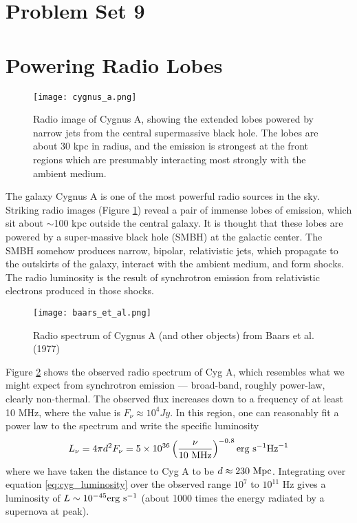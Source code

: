 \documentclass[11pt]{article}
\begin{document}
\pagestyle{empty}

\section*{\centering Problem Set 9}

\section{Powering Radio Lobes}

\begin{figure}[!ht]\centering
\texttt{[image: cygnus\_a.png]}
\caption{
Radio image of Cygnus A, showing the extended lobes powered by narrow jets from
the central supermassive black hole. The lobes are about 30 kpc in radius,
and the emission is strongest at the front regions which are presumably
interacting most strongly with the ambient medium.
}\label{fig:cygnus_a}
\end{figure}

The galaxy Cygnus A is one of the most powerful radio sources in the sky.
Striking radio images (Figure \ref{fig:cygnus_a}) reveal a pair of immense lobes of emission,
which sit about $\sim$100 kpc outside the central galaxy. It is thought that these
lobes are powered by a super-massive black hole (SMBH) at the galactic center.
The SMBH somehow produces narrow, bipolar, relativistic jets, which propagate
to the outskirts of the galaxy, interact with the ambient medium, and form
shocks. The radio luminosity is the result of synchrotron emission from
relativistic electrons produced in those shocks.

\begin{figure}[!ht]\centering
\texttt{[image: baars\_et\_al.png]}
\caption{
Radio spectrum of Cygnus A (and other objects) from Baars et al. (1977)
}\label{fig:baars_et_al}
\end{figure}

Figure \ref{fig:baars_et_al} shows the observed radio spectrum of Cyg A, which
resembles what we might expect from synchrotron emission --- broad-band, roughly
power-law, clearly non-thermal. The observed flux increases down to a frequency
of at least 10 MHz, where the value is
$F_\nu\approx10^4 Jy$.  In this region, one can reasonably fit a power law to
the spectrum and write the specific luminosity
\begin{equation}
L_\nu=4\pi d^2F_\nu=5\times 10^{36}\left(\frac{\nu}{10~{\rm MHz}}\right)^{-0.8} {\rm erg~s}^{-1}{\rm Hz}^{-1}
\label{eq:cyg_luminosity}
\end{equation}
where we have taken the distance to Cyg A to be $d\approx230~{\rm Mpc}$.  Integrating over
equation \ref{eq:cyg_luminosity} over the observed range $10^7$ to $10^{11}$ Hz gives a luminosity
of $L\sim10^{-45}{\rm erg~s}^{-1}$ (about 1000 times the energy radiated by a supernova at peak).
\end{document}
